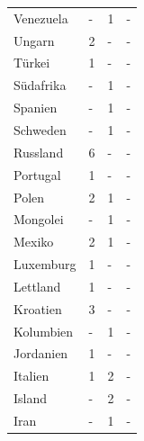 \documentclass[a4paper,
fontsize=11pt,
oneside,
numbers=noperiodatend,
parskip=half-,
bibliography=totoc,
final
]{scrartcl}
\begin{document}
\begin{longtable}{llll}
Venezuela                 & -                    & 1                    & -                    \\
Ungarn                    & 2                    & -                    & -                    \\
Türkei                    & 1                    & -                    & -                    \\
Südafrika                 & -                    & 1                    & -                    \\
Spanien                   & -                    & 1                    & -                    \\
Schweden                  & -                    & 1                    & -                    \\
Russland                  & 6                    & -                    & -                    \\
Portugal                  & 1                    & -                    & -                    \\
Polen                     & 2                    & 1                    & -                    \\
Mongolei                  & -                    & 1                    & -                    \\
Mexiko                    & 2                    & 1                    & -                    \\
Luxemburg                 & 1                    & -                    & -                    \\
Lettland                  & 1                    & -                    & -                    \\
Kroatien                  & 3                    & -                    & -                    \\
Kolumbien                 & -                    & 1                    & -                    \\
Jordanien                 & 1                    & -                    & -                    \\
Italien                   & 1                    & 2                    & -                    \\
Island                    & -                    & 2                    & -                    \\
Iran                      & -                    & 1                    & -                    \\

\end{longtable}
\end{document}
